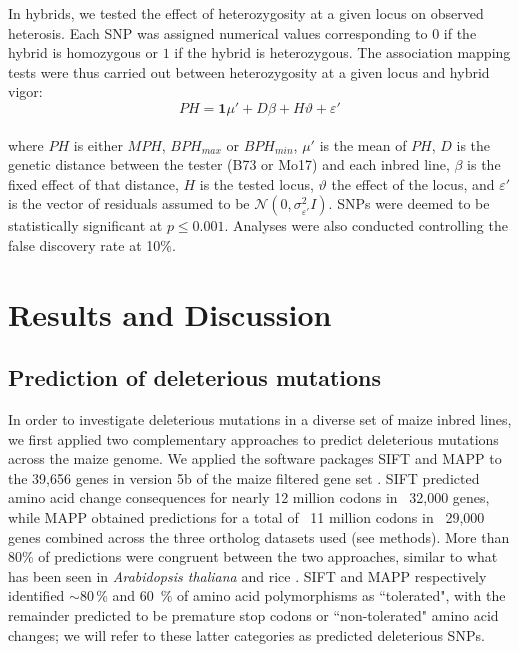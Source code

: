 \documentclass[12pt]{article}
\begin{document}
In hybrids, we tested the effect of heterozygosity at a given locus on observed heterosis. 
Each SNP was assigned numerical values corresponding to $0$ if the hybrid is homozygous or $1$ if the hybrid is heterozygous. 
The association mapping tests were thus carried out between heterozygosity at a given locus and hybrid vigor:
%
\[PH=\mathbf{1}{\mu}'+D\beta +H\vartheta +{\varepsilon }'\]  \\
%
where $PH$ is either $MPH$, $BPH_{max}$ or $BPH_{min}$, ${\mu}'$ is the mean of $PH$, $D$ is the genetic distance between the tester (B73 or Mo17) and each inbred line, $\beta$ is the fixed effect of that distance, $H$ is the tested locus, $\vartheta$ the effect of the locus, and ${\varepsilon }'$ is the vector of residuals assumed to be $\mathcal{N}(0,\sigma_{ {\varepsilon}'}^{2}I)$.  
SNPs were deemed to be statistically significant at $p\leq 0.001$. Analyses were also conducted controlling the false discovery rate \citep{Benjamini1995} at 10\%. 

\section*{Results and Discussion}

\subsection*{Prediction of deleterious mutations}

In order to investigate deleterious mutations in a diverse set of maize inbred lines, we first applied two complementary approaches to predict deleterious mutations across the maize genome.  We applied the software packages SIFT \citep{Ng2003, Ng2006} and MAPP \citep{Stone2005} to the 39,656 genes in version 5b of the maize filtered gene set  \citep[\url{http://www.maizesequence.org};][]{Schnable2009}. SIFT predicted amino acid change consequences for nearly 12 million codons in ~32,000 genes, while MAPP obtained predictions for a total of ~11 million codons in ~29,000 genes combined across the three ortholog datasets used (see methods). More than 80\% of predictions were congruent between the two approaches, similar to what has been seen in \emph{Arabidopsis thaliana} and rice \citep{Gunther2010}. SIFT and MAPP respectively identified $\sim$80\,\% and 60\, \% of amino acid polymorphisms as ``tolerated", with the remainder predicted to be premature stop codons or ``non-tolerated" amino acid changes; we will refer to these latter categories as predicted deleterious SNPs.
\end{document}
